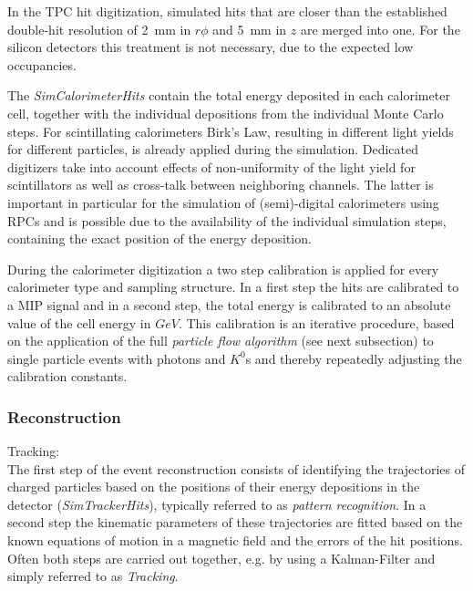 In the TPC hit digitization, simulated hits that are closer than the established double-hit resolution of 2~mm in $r\phi$ and 5~mm
in $z$ are merged into one. For the silicon detectors this treatment is not necessary, due to the expected low occupancies.

The \emph{SimCalorimeterHits} contain the total energy deposited in each calorimeter cell, together with the individual depositions
from the individual Monte Carlo steps. For scintillating calorimeters Birk's Law, resulting in different light yields for different
particles, is already applied during the simulation. Dedicated digitizers take into account effects of non-uniformity of the light yield
for scintillators as well as cross-talk between neighboring channels. The latter is important in particular for the simulation of
(semi)-digital calorimeters using RPCs and is possible due to the availability of the individual simulation steps, containing
the exact position of the energy deposition.

During the calorimeter digitization a two step calibration is applied for every calorimeter type and sampling structure. In a first step
the hits are calibrated to a MIP signal and in a second step, the total energy is calibrated to an absolute value of the
cell energy in $GeV$. This calibration is an iterative procedure, based on the application of the full
\emph{particle flow algorithm }(see next subsection) to single particle events with photons and $K^0$s and thereby
repeatedly adjusting the calibration constants.


  
\subsubsection{Reconstruction}

Tracking: \\

The first step of the event reconstruction consists of identifying the trajectories of charged particles based on the positions of their
energy depositions in the detector (\emph{SimTrackerHits}), typically referred to as \emph{pattern recognition}. In a second step the
kinematic parameters of these trajectories are fitted based on the known equations of motion in a magnetic field and the errors of the
hit positions. Often both steps are carried out together, e.g. by using a Kalman-Filter and simply referred to as \emph{Tracking}.


